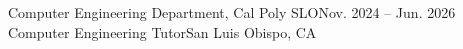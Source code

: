 \resumeSubheading
      {Computer Engineering Department, Cal Poly SLO}{Nov. 2024 -- Jun. 2026}
      {Computer Engineering Tutor}{San Luis Obispo, CA}
      \resumeItemListStart
    \resumeItemListEnd
